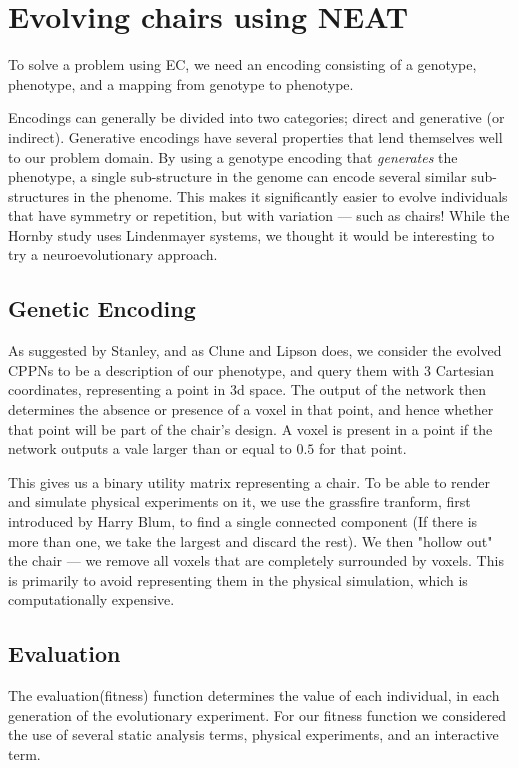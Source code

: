\section{Evolving chairs using NEAT}
To solve a problem using EC, we need an encoding consisting of a genotype,
phenotype, and a mapping from genotype to phenotype.

Encodings can generally be divided into two categories; direct and generative
(or indirect). Generative encodings have several properties that lend themselves
well to our problem domain. By using a genotype encoding that \emph{generates}
the phenotype, a single sub-structure in the genome can encode several similar
sub-structures in the phenome. This makes it significantly easier to evolve
individuals that have symmetry or repetition, but with variation --- such as
chairs! While the Hornby study\cite{paper:ev4} uses Lindenmayer
systems\cite{Hornby2003}, we thought it would be interesting to try a
neuroevolutionary approach.

\subsection{Genetic Encoding}
As suggested by Stanley\cite{Stanley2007}, and as Clune and
Lipson\cite{Clune:2011:EOG:2078245.2078246} does, we consider the evolved CPPNs
to be a description of our phenotype, and query them with 3 Cartesian
coordinates, representing a point in 3d space. The output of the network then
determines the absence or presence of a voxel in that point, and hence whether
that point will be part of the chair's design. A voxel is present in a point if
the network outputs a vale larger than or equal to $0.5$ for that point.

This gives us a binary utility matrix representing a chair. To be able to render
and simulate physical experiments on it, we use the grassfire tranform, first
introduced by Harry Blum\cite{blum67}, to find a single connected component (If
there is more than one, we take the largest and discard the rest). We then
"hollow out" the chair --- we remove all voxels that are completely surrounded by
voxels. This is primarily to avoid representing them in the physical simulation,
which is computationally expensive.

\subsection{Evaluation}
The evaluation(fitness) function determines the value of each individual, in
each generation of the evolutionary experiment. For our fitness function we
considered the use of several static analysis terms, physical experiments, and
an interactive term.

